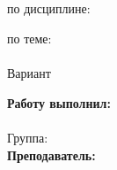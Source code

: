 \begin{titlepage}	%

	\begin{center}		%

		\large \university \\
		\large \faculty \\
		\large \department \\[6cm]

		\large \docname \\[1cm]
		по дисциплине:\\
		\large \subject \\
		по теме:\\
		\large \theme \\[3mm]
		\large Вариант \var \\[5cm]

	\end{center}


	\begin{flushright} %
		\begin{minipage}{0.25\textwidth} %
			\begin{flushleft} %

				\large\textbf{Работу выполнил:}\\
				\large \studentname \\
				\large {Группа:} \group \\

				\large \textbf{Преподаватель:}\\
				\large \tutorname

			\end{flushleft}
		\end{minipage}
	\end{flushright}

	\vfill %

	\begin{center}
		\large \city \\
		\large \the\year %
	\end{center} %

\end{titlepage} %

\vfill %
